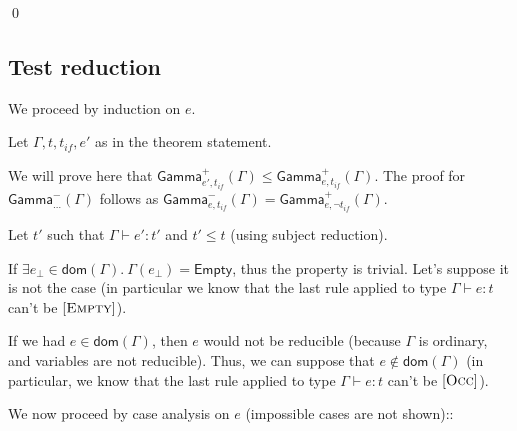 \documentclass[a4paper]{article}%
\newcommand{\dom}[1]{\textsf{dom}(#1)}
\newcommand{\Empty} {\textsf{Empty}}%
\newcommand{\Genv}[3]{\textsf{Gamma}^{#1}_{#2}(#3)}
\theoremstyle{definition}
\newcommand {\Rule}[1] {[\textsc{#1}]}
\begin{document}
        \qed
    
        \subsection{Test reduction}
    
        We proceed by induction on $e$.
    
        Let $\Gamma,t,t_{if},e'$ as in the theorem statement.
        
        We will prove here that $\Genv + {e',t_{if}} \Gamma \leq \Genv + {e,t_{if}} \Gamma$.
        The proof for $\Genv - {\dots} \Gamma$ follows as $\Genv - {e,t_{if}} \Gamma=\Genv + {e,\neg t_{if}} \Gamma$.
    
        Let $t'$ such that $\Gamma \vdash e':t'$ and $t'\leq t$ (using subject reduction).
    
        If $\exists e_{\bot} \in \dom\Gamma.\ \Gamma(e_{\bot}) = \Empty$, thus the property is trivial.
        Let's suppose it is not the case (in particular we know that the last rule applied to type $\Gamma \vdash e:t$ can't be $\Rule{Empty}$).
    
        If we had $e\in\dom\Gamma$, then $e$ would not be reducible (because $\Gamma$ is ordinary, and variables are not reducible).
        Thus, we can suppose that $e\not\in\dom\Gamma$ (in particular, we know that the last rule applied to type $\Gamma \vdash e:t$ can't be $\Rule{Occ}$).
    
        We now proceed by case analysis on $e$ (impossible cases are not shown)::
    
\end{document}
